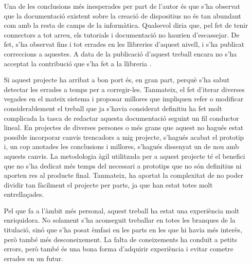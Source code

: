 Una de les conclusions més inesperades per part de l'autor és que s'ha
observat que la documentació existent sobre la creació de dispositius
 no és tan abundant com amb la resta de camps de la informàtica.
Qualsevol diria que, pel fet de tenir connectors  a tot arreu,
els tutorials i documentació no haurien d'escassejar. De
fet, s'ha observat fins i tot errades en les llibreries d'aquest nivell, i s'ha
publicat correccions a aquestes. A data de la publicació d'aquest treball encara
no s'ha acceptat la contribució que s'ha fet a la llibreria .

Si aquest projecte ha arribat a bon port és, en gran part, perquè s'ha sabut
detectar les errades a temps per a corregir-les. Tanmateix, el fet d'iterar
diverses vegades en el mateix sistema i proposar millores que
impliquen refer o modificar considerablement el treball que ja s'havia
considerat definitiu ha fet molt complicada la tasca de redactar aquesta
documentació seguint un fil conductor lineal. En projectes de diverses persones
o més grans que aquest no hagués estat possible incorporar canvis trencadors
a mig projecte, s'hagués acabat el prototip i, un cop anotades les conclusions
i millores, s'hagués dissenyat un de nou amb aquests canvis. La metodologia
àgil utilitzada per a aquest projecte té el benefici que no s'ha dedicat més
temps del necessari a prototips que no són definitius ni aporten res al
producte final. Tanmateix, ha aportat la complexitat de no poder dividir tan
fàcilment el projecte per parts, ja que han estat totes molt entrellaçades.

Pel que fa a l'àmbit més personal, aquest treball ha estat una experiència molt
enriquidora. No solament s'ha aconseguit treballar en totes les branques de la
titulació, sinó que s'ha posat èmfasi en les parts en les que hi havia més
interès, però també més desconeixement. La falta de coneixements ha conduït a
petits errors, però també és una bona forma d'adquirir experiència i evitar
cometre errades en un futur.
